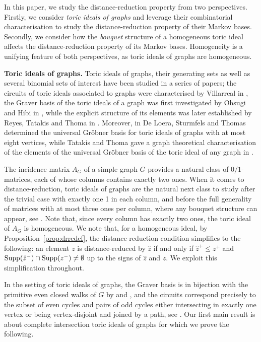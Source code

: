 \documentclass[a4paper, 12pt]{article}
\theoremstyle{plain}
\theoremstyle{definition}
\theoremstyle{remark}
\begin{document}
\medskip
In this paper, we study the distance-reduction property from two perspectives. Firstly, we consider \emph{toric ideals of graphs} and leverage their combinatorial characterisation to study the distance-reduction property of their Markov bases. Secondly, we consider how the \emph{bouquet} structure of a homogeneous toric ideal affects the distance-reduction property of its Markov bases. Homogeneity is a unifying feature of both perspectives, as toric ideals of graphs are homogeneous.


\medskip \noindent
\textbf{Toric ideals of graphs.} Toric ideals of graphs, their generating sets as well as several binomial sets of interest have been studied in a series of papers; the circuits of toric ideals associated to graphs were characterised by Villarreal in \cite{Vil_1995},  the Graver basis of the toric ideals of a graph was first investigated by Ohsugi and Hibi in \cite{ohsugi-hibi-quad-binoms}, while the explicit structure of its elements was later established by Reyes, Tatakis and Thoma in \cite{Reyes2012minimal}. Moreover, in \cite{DeLoera_etal} De Loera, Sturmfels and Thomas determined  the universal Gr\"obner basis for toric ideals of graphs with at most eight vertices, while Tatakis and Thoma gave a graph theoretical characterisation of the elements of the universal Gröbner basis of the toric ideal of any graph in \cite{TATAKIS_Thoma_UGrobner}.   

The incidence matrix $A_G$ of a simple graph $G$ provides a natural class of $0/1$-matrices, each of whose columns contains exactly two ones. 
When it comes to distance-reduction, toric ideals of graphs are the natural next class to study after the trivial case with exactly one 1 in each column, and before the full generality of matrices with at most three ones per column, where any bouquet structure can appear, see \cite{petrovic2019hypergraph}. 
Note that, since every column has exactly two ones, the toric ideal of $A_G$ is homogeneous.
We note that, for a homogeneous ideal, by Proposition~\ref{prop:drredef}, the distance-reduction condition simplifies to the following: an element $z$ is distance-reduced by $\hat{z}$ 
if and only if $\hat{z}^+ \leq z^+$ and ${\rm Supp}(\hat{z}^-) \cap {\rm Supp}(z^-) \neq \emptyset$ up to the signs of $\hat z$ and $z$. We exploit this simplification throughout.


In the setting of toric ideals of graphs, the Graver basis is in bijection with the primitive even closed walks of $G$ by \cite{ohsugi-hibi-quad-binoms} and \cite{sturmfels1996grobner}, and the circuits correspond precisely to the subset of even cycles and pairs of odd cycles either intersecting in exactly one vertex or being vertex-disjoint and joined by a path,  see \cite[Proposition 4.2]{Vil_1995}. 
Our first main result is about complete intersection toric ideals of graphs for which we prove the following. 
\end{document}
